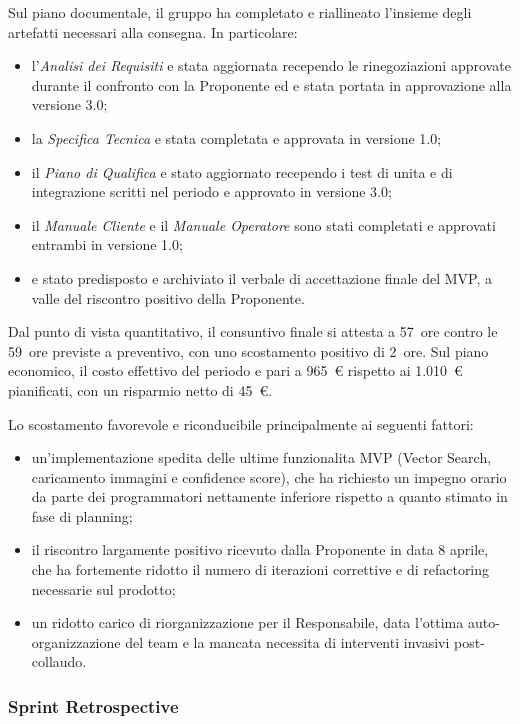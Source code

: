\documentclass[a4paper, 11pt, oneside]{scrartcl} %
\begin{document}
Sul piano documentale, il gruppo ha completato e riallineato l'insieme degli artefatti necessari alla consegna. In particolare:
\begin{itemize}[noitemsep, topsep=2pt]
    \item l'\textit{Analisi dei Requisiti} e stata aggiornata recependo le rinegoziazioni approvate durante il confronto con la Proponente ed e stata portata in approvazione alla versione 3.0;
    \item la \textit{Specifica Tecnica} e stata completata e approvata in versione 1.0;
    \item il \textit{Piano di Qualifica} e stato aggiornato recependo i test di unita e di integrazione scritti nel periodo e approvato in versione 3.0;
    \item il \textit{Manuale Cliente} e il \textit{Manuale Operatore} sono stati completati e approvati entrambi in versione 1.0;
    \item e stato predisposto e archiviato il verbale di accettazione finale del MVP, a valle del riscontro positivo della Proponente.
\end{itemize}

Dal punto di vista quantitativo, il consuntivo finale si attesta a 57~ore contro le 59~ore previste a preventivo, con uno scostamento positivo di 2~ore. Sul piano economico, il costo effettivo del periodo e pari a 965~€ rispetto ai 1.010~€ pianificati, con un risparmio netto di 45~€.

Lo scostamento favorevole e riconducibile principalmente ai seguenti fattori:
\begin{itemize}[noitemsep, topsep=2pt]
    \item un'implementazione spedita delle ultime funzionalita MVP (Vector Search, caricamento immagini e confidence score), che ha richiesto un impegno orario da parte dei programmatori nettamente inferiore rispetto a quanto stimato in fase di planning;
    \item il riscontro largamente positivo ricevuto dalla Proponente in data 8 aprile, che ha fortemente ridotto il numero di iterazioni correttive e di refactoring necessarie sul prodotto;
    \item un ridotto carico di riorganizzazione per il Responsabile, data l'ottima auto-organizzazione del team e la mancata necessita di interventi invasivi post-collaudo.
\end{itemize}

\subsubsection*{Sprint Retrospective}
\end{document}
